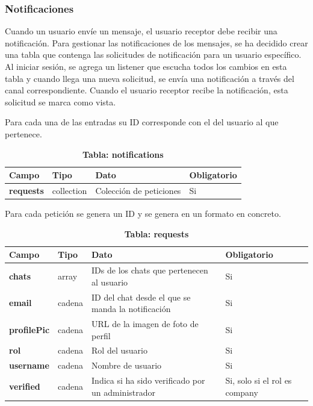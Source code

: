 \documentclass[a4paper, 12pt]{article}
\begin{document}
\subsubsection{Notificaciones}

Cuando un usuario envíe un mensaje, el usuario receptor debe recibir una notificación. Para gestionar las notificaciones de los mensajes, se ha decidido crear una tabla que contenga las solicitudes de notificación para un usuario específico. Al iniciar sesión, se agrega un listener que escucha todos los cambios en esta tabla y cuando llega una nueva solicitud, se envía una notificación a través del canal correspondiente. Cuando el usuario receptor recibe la notificación, esta solicitud se marca como vista. 

Para cada una de las entradas su ID corresponde con el del usuario al que pertenece.

\begin{table}[H]
\captionsetup{justification=raggedright,singlelinecheck=false}
\caption{\textbf{Tabla: notifications}}
\label{tab:notifications}
	\begin{tabular}{|m{3.2cm}|m{2cm}|m{5cm}|m{3cm}|}
	\hline
	\textbf{Campo} & \textbf{Tipo} & \textbf{Dato} & \textbf{Obligatorio} \\ 
	\hline
	\textbf{requests} & collection & Colección de peticiones & Si \\ 
	\hline
	\end{tabular}
\end{table}

Para cada petición se genera un ID y se genera en un formato en concreto.

\begin{table}[H]
\captionsetup{justification=raggedright,singlelinecheck=false}
\caption{\textbf{Tabla: requests}}
\label{tab:requests}
	\begin{tabular}{|m{3.2cm}|m{2cm}|m{5cm}|m{3cm}|}
	\hline
	\textbf{Campo} & \textbf{Tipo} & \textbf{Dato} & \textbf{Obligatorio} \\ 
	\hline
	\textbf{chats} & array & IDs de los chats que pertenecen al usuario & Si \\ 
	\hline
	\textbf{email} & cadena &  ID del chat desde el que se manda la notificación & Si \\ 
	\hline
	\textbf{profilePic} & cadena & URL de la imagen de foto de perfil & Si \\ 
	\hline
	\textbf{rol} & cadena & Rol del usuario & Si \\ 
	\hline
	\textbf{username} & cadena & Nombre de usuario & Si \\ 
	\hline
	\textbf{verified} & cadena & Indica si ha sido verificado por un administrador & Si, solo si el rol es company \\ 
	\hline
	\end{tabular}
\end{table}
\end{document}
